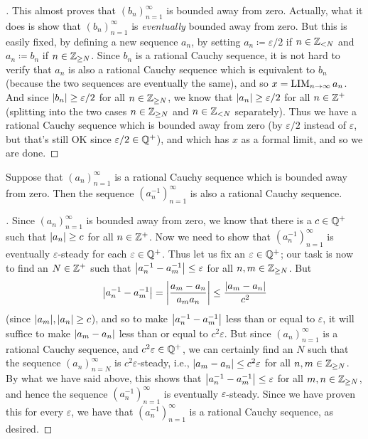 \begin{proof}[]
  This almost proves that \((b_n)_{n = 1}^{\infty}\) is bounded away from zero.
  Actually, what it does is show that \((b_n)_{n = 1}^{\infty}\) is \emph{eventually} bounded away from zero.
  But this is easily fixed, by defining a new sequence \(a_n\), by setting \(a_n \coloneqq \varepsilon / 2\) if \(n \in \mathbb{Z}_{< N}\) and \(a_n \coloneqq b_n\) if \(n \in \mathbb{Z}_{\geq N}\).
  Since \(b_n\) is a rational Cauchy sequence, it is not hard to verify that \(a_n\) is also a rational Cauchy sequence which is equivalent to \(b_n\) (because the two sequences are eventually the same), and so \(x = \operatorname*{LIM}_{n \to \infty} a_n\).
  And since \(\left\lvert b_n\right\rvert \geq \varepsilon / 2\) for all \(n \in \mathbb{Z}_{\geq N}\), we know that \(\left\lvert a_n\right\rvert \geq \varepsilon / 2\) for all \(n \in \mathbb{Z}^+\) (splitting into the two cases \(n \in \mathbb{Z}_{\geq N}\) and \(n \in \mathbb{Z}_{< N}\) separately).
  Thus we have a rational Cauchy sequence which is bounded away from zero (by \(\varepsilon / 2\) instead of \(\varepsilon\), but that's still OK since \(\varepsilon / 2 \in \mathbb{Q}^+\)), and which has \(x\) as a formal limit, and so we are done.
\end{proof}

\begin{lem}\label{i:5.3.15}
  Suppose that \((a_n)_{n = 1}^{\infty}\) is a rational Cauchy sequence which is bounded away from zero.
  Then the sequence \((a_n^{-1})_{n = 1}^{\infty}\) is also a rational Cauchy sequence.
\end{lem}

\begin{proof}[]
  Since \((a_n)_{n = 1}^{\infty}\) is bounded away from zero, we know that there is a \(c \in \mathbb{Q}^+\) such that \(\left\lvert a_n\right\rvert \geq c\) for all \(n \in \mathbb{Z}^+\).
  Now we need to show that \((a_n^{-1})_{n = 1}^{\infty}\) is eventually \(\varepsilon\)-steady for each \(\varepsilon \in \mathbb{Q}^+\).
  Thus let us fix an \(\varepsilon \in \mathbb{Q}^+\);
  our task is now to find an \(N \in \mathbb{Z}^+\) such that \(\left\lvert a_n^{-1} - a_m^{-1}\right\rvert \leq \varepsilon\) for all \(n, m \in \mathbb{Z}_{\geq N}\).
  But
  \[
    \left\lvert a_n^{-1} - a_m^{-1}\right\rvert = \left\lvert\dfrac{a_m - a_n}{a_m a_n}\right\rvert \leq \dfrac{\left\lvert a_m - a_n\right\rvert}{c^2}
  \]
  (since \(\abs{a_m}, \abs{a_n} \geq c\)), and so to make \(\left\lvert a_n^{-1} - a_m^{-1}\right\rvert\) less than or equal to \(\varepsilon\), it will suffice to make \(\left\lvert a_m - a_n\right\rvert\) less than or equal to \(c^2 \varepsilon\).
  But since \((a_n)_{n = 1}^{\infty}\) is a rational Cauchy sequence, and \(c^2 \varepsilon \in \mathbb{Q}^+\), we can certainly find an \(N\) such that the sequence \((a_n)_{n = N}^{\infty}\) is \(c^2 \varepsilon\)-steady, i.e., \(\left\lvert a_m - a_n\right\rvert \leq c^2 \varepsilon\) for all \(n, m \in \mathbb{Z}_{\geq N}\).
  By what we have said above, this shows that \(\left\lvert a_n^{-1} - a_m^{-1}\right\rvert \leq \varepsilon\) for all \(m, n \in \mathbb{Z}_{\geq N}\), and hence the sequence \((a_n^{-1})_{n = 1}^{\infty}\) is eventually \(\varepsilon\)-steady.
  Since we have proven this for every \(\varepsilon\), we have that \((a_n^{-1})_{n = 1}^{\infty}\) is a rational Cauchy sequence, as desired.
\end{proof}

